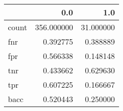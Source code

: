 \begin{tabular}{lrr}
\toprule
{} &         0.0 &        1.0 \\
\midrule
count &  356.000000 &  31.000000 \\
fnr   &    0.392775 &   0.388889 \\
fpr   &    0.566338 &   0.148148 \\
tnr   &    0.433662 &   0.629630 \\
tpr   &    0.607225 &   0.166667 \\
bacc  &    0.520443 &   0.250000 \\
\bottomrule
\end{tabular}
